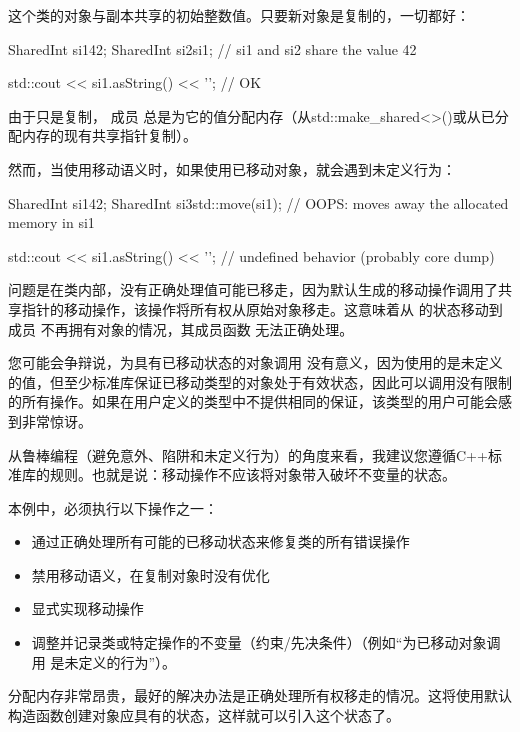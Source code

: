 这个类的对象与副本共享的初始整数值。只要新对象是复制的，一切都好：

\begin{cppcode}
SharedInt si1{42};
SharedInt si2{si1}; // si1 and si2 share the value 42

std::cout << si1.asString() << '\n'; // OK
\end{cppcode}

由于只是复制， 成员  总是为它的值分配内存（从std::make_shared<>()或从已分配内存的现有共享指针复制）。

然而，当使用移动语义时，如果使用已移动对象，就会遇到未定义行为：

\begin{cppcode}
SharedInt si1{42};
SharedInt si3{std::move(si1)}; // OOPS: moves away the allocated memory in si1

std::cout << si1.asString() << '\n'; // undefined behavior (probably core dump)
\end{cppcode}

问题是在类内部，没有正确处理值可能已移走，因为默认生成的移动操作调用了共享指针的移动操作，该操作将所有权从原始对象移走。这意味着从  的状态移动到成员  不再拥有对象的情况，其成员函数  无法正确处理。

您可能会争辩说，为具有已移动状态的对象调用  没有意义，因为使用的是未定义的值，但至少标准库保证已移动类型的对象处于有效状态，因此可以调用没有限制的所有操作。如果在用户定义的类型中不提供相同的保证，该类型的用户可能会感到非常惊讶。

从鲁棒编程（避免意外、陷阱和未定义行为）的角度来看，我建议您遵循C++标准库的规则。也就是说：移动操作不应该将对象带入破坏不变量的状态。

本例中，必须执行以下操作之一：

\begin{itemize}
	\item 通过正确处理所有可能的已移动状态来修复类的所有错误操作
	\item 禁用移动语义，在复制对象时没有优化
	\item 显式实现移动操作
	\item 调整并记录类或特定操作的不变量（约束/先决条件）（例如“为已移动对象调用  是未定义的行为”）。
\end{itemize}

分配内存非常昂贵，最好的解决办法是正确处理所有权移走的情况。这将使用默认构造函数创建对象应具有的状态，这样就可以引入这个状态了。

